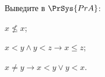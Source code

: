 Выведите в $\PrSys{PrA}$:
\begin{enumcyr}
    \item $x \not\le x$;
    \item $x < y \land y < z \rightarrow x \le z$;
    \item $x \neq y \rightarrow x < y \lor y < x$.
\end{enumcyr}
